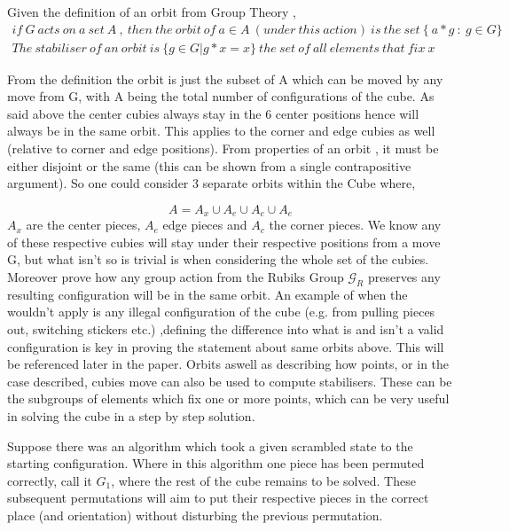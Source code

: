 \documentclass{article}
\begin{document}
Given the definition of an orbit from Group Theory ,
\begin{equation}
\begin{aligned}
if\ G\ acts\ on\ a\ set\ A\ ,\ then\ the\ orbit\ of\ a \in A\ (under\ this\ action)\ is\ the\ set\ \{\ a*g\ :\ g \in G\} \\
The\ stabiliser\ of\ an\ orbit\ is\ \{g\in G | g*x = x\}\ the\ set\ of\ all\ elements\ that\ fix\ x
\end{aligned}
\end{equation}

From the definition the orbit is just the subset of A which can be moved by any move from G, with A being the total number of configurations of the cube. As said above the center cubies always stay in the 6 center positions hence will always be in the same orbit. This applies to the corner and edge cubies as well (relative to corner and edge positions). 
From properties of an orbit , it must be either disjoint or the same (this can be shown from a single contrapositive argument). So one could consider 3 separate orbits within the Cube where,

\begin{equation}
A = A_{x}\cup A_{e}\cup A_{c}\cup A_{e}
\end{equation} 
$A_{x}$ are the center pieces, $A_{e}$ edge pieces and $A_{c}$ the corner pieces. We know any of these respective cubies will stay under their respective positions from a move G, but what isn't so is trivial is when considering the whole set of the cubies. Moreover prove how any group action from the Rubiks Group $\mathcal{G}_{R}$ preserves any resulting configuration will be in the same orbit.%
An example of when the wouldn't apply is any illegal configuration of the cube (e.g. from pulling pieces out, switching stickers etc.) ,defining the difference into what is and isn't a valid configuration is key in proving the statement about same orbits above. This will be referenced later in the paper.
Orbits aswell as describing how points, or in the case described, cubies move can also be used to compute stabilisers. These can be the subgroups of elements which fix one or more points, which can be very useful in solving the cube in a step by step solution.%

Suppose there was an algorithm which took a given scrambled state to the starting configuration. Where in this algorithm one piece has been permuted correctly, call it $G_{1}$, where the rest of the cube remains to be solved. These subsequent permutations will aim to put their respective pieces in the correct place (and orientation) without disturbing the previous permutation.   
\end{document}
